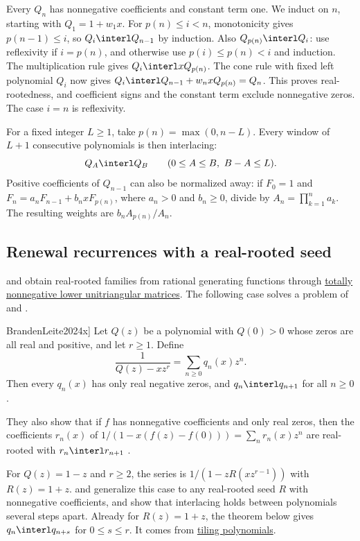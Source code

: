 \begin{proof*}
Every $Q_n$ has nonnegative coefficients and constant term one.
We induct on $n$, starting with $Q_1=1+w_1x$.
For $p(n)\leq i<n$, monotonicity gives $p(n-1)\leq i$, so
$Q_i\interl Q_{n-1}$ by induction.
Also $Q_{p(n)}\interl Q_i$: use reflexivity if $i=p(n)$,
and otherwise use $p(i)\leq p(n)<i$ and induction.
The multiplication rule gives $Q_i\interl xQ_{p(n)}$.
The cone rule with fixed left polynomial $Q_i$ now gives
$Q_i\interl Q_{n-1}+w_nxQ_{p(n)}=Q_n$.
This proves real-rootedness, and coefficient signs and the constant term
exclude nonnegative zeros. The case $i=n$ is reflexivity.
\end{proof*}

For a fixed integer $L\geq1$, take $p(n)=\max(0,n-L)$.
Every window of $L+1$ consecutive polynomials is then interlacing:
\[
 Q_A\interl Q_B\qquad(0\leq A\leq B,\ B-A\leq L).
\]
Positive coefficients of $Q_{n-1}$ can also be normalized away:
if $F_0=1$ and $F_n=a_nF_{n-1}+b_nxF_{p(n)}$, where
$a_n>0$ and $b_n\geq0$, divide by $A_n=\prod_{k=1}^n a_k$.
The resulting weights are $b_nA_{p(n)}/A_n$.

\subsection[interlacingRenewalRecurrences]{Renewal recurrences with a real-rooted seed}

 and  obtain
real-rooted families from rational generating functions through
\hyperref[tnnLowerUnitriangularMatrix]{totally nonnegative lower
unitriangular matrices}.  The following case solves a problem of
 and .

\begin{theorem}[Brändén--Leite, \cite[Thm.~4.5]{BrandenLeite2024x}]
\label{brandenLeiteRenewal}
Let $Q(z)$ be a polynomial with $Q(0)>0$ whose zeros are all real and
positive, and let $r\geq1$.  Define
\[
 \frac{1}{Q(z)-xz^r}=\sum_{n\geq0}q_n(x)z^n.
\]
Then every $q_n(x)$ has only real negative zeros, and
$q_n\interl q_{n+1}$ for all $n\geq0$.
\end{theorem}

They also show that if $f$ has nonnegative coefficients and only real
zeros, then the coefficients $r_n(x)$ of
$1/(1-x(f(z)-f(0)))=\sum_n r_n(x)z^n$ are real-rooted with
$r_n\interl r_{n+1}$ \cite[Thm.~4.4]{BrandenLeite2024x}.

For $Q(z)=1-z$ and $r\geq2$, the series is $1/(1-zR(xz^{r-1}))$ with
$R(z)=1+z$.   and  generalize
this case to any real-rooted seed $R$ with nonnegative coefficients, and
show that interlacing holds between polynomials several steps apart.
Already for $R(z)=1+z$, the theorem below gives $q_n\interl q_{n+s}$ for
$0\leq s\leq r$.  It comes from \hyperref[realRootedTilingPolynomials]{tiling
polynomials}.

